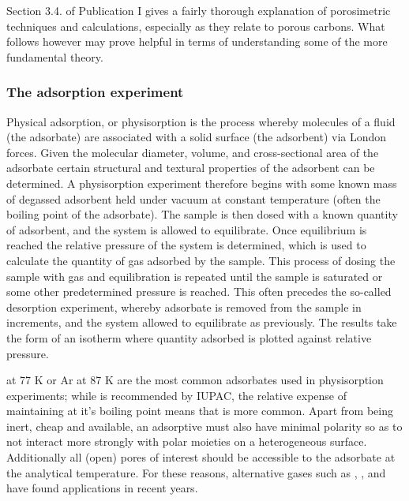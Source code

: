 Section 3.4. of Publication I gives a fairly thorough explanation of porosimetric techniques and calculations, especially as they relate to porous carbons. What follows however may prove helpful in terms of understanding some of the more fundamental theory. 

\subsubsection{The adsorption experiment}
Physical adsorption, or physisorption is the process whereby molecules of a fluid (the adsorbate) are associated with a solid surface (the adsorbent) via London forces. Given the molecular diameter, volume, and cross-sectional area of the adsorbate
certain structural and textural properties of the adsorbent can be determined.\citep{Brunauer1938Adsorption} A physisorption experiment therefore begins with some known mass of degassed adsorbent held under vacuum at constant temperature (often the boiling point of the adsorbate). The sample is then dosed with a known quantity of adsorbent, and the system is allowed to equilibrate. Once equilibrium is reached the relative pressure of the system is determined, which is used to calculate the quantity of gas adsorbed by the sample. This process of dosing the sample with gas and equilibration is repeated until the sample is saturated or some other predetermined pressure is reached. This often precedes the so-called desorption experiment, whereby adsorbate is removed from the sample in increments, and the system allowed to equilibrate as previously. The results take the form of an isotherm where quantity adsorbed is plotted against
relative pressure.\citep{Brunauer1938Adsorption, Langmuir1916constitution, Thommes2015Physisorption}

 at 77 K or Ar at 87 K are the most common adsorbates used in physisorption experiments; while  is recommended by IUPAC,\citep{Thommes2015Physisorption} the relative expense of maintaining  at it's boiling point means that  is more common. Apart from being inert, cheap and available, an adsorptive must also have minimal polarity so as to not interact more strongly with polar moieties on a heterogeneous surface. Additionally all (open) pores of interest should be accessible to the adsorbate at the analytical temperature. For these reasons, alternative gases such as , , and  have found applications in recent years.\citep{Jagiello2019Enhanced, Blankenship2022Confirmation, Jagiello2008Characterization}

